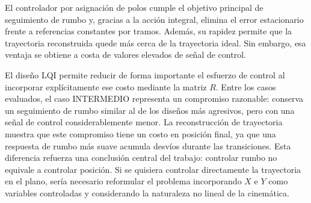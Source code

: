 \documentclass[11pt,a4paper]{article}
\begin{document}
El controlador por asignación de polos cumple el objetivo principal de seguimiento de rumbo y, gracias a la acción integral, elimina el error estacionario frente a referencias constantes por tramos. Además, su rapidez permite que la trayectoria reconstruida quede más cerca de la trayectoria ideal. Sin embargo, esa ventaja se obtiene a costa de valores elevados de señal de control.

El diseño LQI permite reducir de forma importante el esfuerzo de control al incorporar explícitamente ese costo mediante la matriz $R$. Entre los casos evaluados, el caso INTERMEDIO representa un compromiso razonable: conserva un seguimiento de rumbo similar al de los diseños más agresivos, pero con una señal de control considerablemente menor. La reconstrucción de trayectoria muestra que este compromiso tiene un costo en posición final, ya que una respuesta de rumbo más suave acumula desvíos durante las transiciones. Esta diferencia refuerza una conclusión central del trabajo: controlar rumbo no equivale a controlar posición. Si se quisiera controlar directamente la trayectoria en el plano, sería necesario reformular el problema incorporando $X$ e $Y$ como variables controladas y considerando la naturaleza no lineal de la cinemática.
\end{document}
